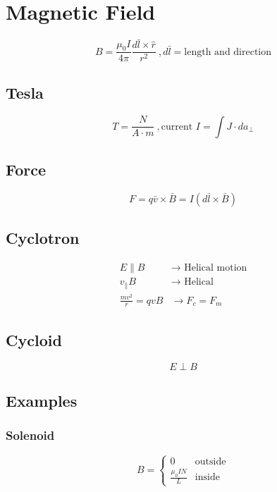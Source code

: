 \documentclass[10pt,a4paper]{article}
\begin{document}
\section{Magnetic Field} %
\label{sec:magnetic_field}
\begin{equation}
    B = \frac{\mu_0 I }{4\pi} \frac{d\bar{l} \times \hat{r}}{r^2}~, d\bar{l}=\textrm{length and direction}
\end{equation}
\subsection{Tesla} %
\label{sub:tesla}
\begin{equation}
    T = \frac{N}{A\cdot m}~, \textrm{current } I = \int J \cdot da_\perp
\end{equation}
\subsection{Force} %
\label{sub:force}
\begin{equation}
    F = q\bar{v} \times \bar{B} = I (d\bar{l} \times \bar{B})
\end{equation}
\subsection{Cyclotron} %
\label{sub:cyclotron}
\begin{align}
    E \parallel B &\rightarrow \textrm{ Helical motion}\\
    v_\parallel B &\rightarrow \textrm{ Helical}\\
    \frac{mv^2}{r} = qvB &\rightarrow F_c = F_m
\end{align}
\subsection{Cycloid} %
\label{sub:cycloid}
\begin{equation}
    E \perp B
\end{equation}
\subsection{Examples} %
\label{sub:examples}
\subsubsection{Solenoid} %
\label{ssub:solenoid}
\[
 B =
  \begin{cases}
   0 & \textrm{outside}  \\
   \frac{\mu_0 IN}{L}& \textrm{inside}
  \end{cases}
\]
\end{document}
